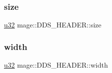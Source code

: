 \subsubsection{\texorpdfstring{size}{size}}
{\footnotesize\ttfamily \hyperlink{namespacemage_af2b398bf98eb10351f49cad73fe2cc73}{u32} mage\+::\+D\+D\+S\+\_\+\+H\+E\+A\+D\+E\+R\+::size}

\hypertarget{structmage_1_1_d_d_s___h_e_a_d_e_r_a2e2e406d167a04116a5ff65bbc63db04}{}\label{structmage_1_1_d_d_s___h_e_a_d_e_r_a2e2e406d167a04116a5ff65bbc63db04} 
\subsubsection{\texorpdfstring{width}{width}}
{\footnotesize\ttfamily \hyperlink{namespacemage_af2b398bf98eb10351f49cad73fe2cc73}{u32} mage\+::\+D\+D\+S\+\_\+\+H\+E\+A\+D\+E\+R\+::width}

